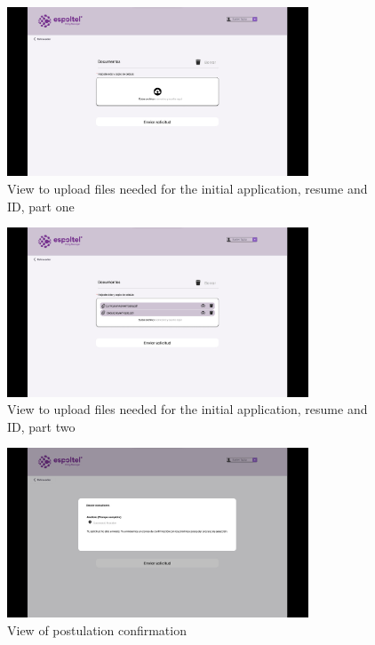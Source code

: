 \documentclass{scrreprt}
\begin{document}
\begin{figure}[H]
	\centering \small
	\includegraphics[width=0.8\textwidth]{WebPrototype/wflow-47.jpeg}
	\caption{View to upload files needed for the initial application, resume and ID, part one}
\end{figure}

\begin{figure}[H]
	\centering \small
	\includegraphics[width=0.8\textwidth]{WebPrototype/wflow-48.jpeg}
	\caption{View to upload files needed for the initial application, resume and ID, part two}
\end{figure}

\begin{figure}[H]
	\centering \small
	\includegraphics[width=0.8\textwidth]{WebPrototype/wflow-49.jpeg}
	\caption{View of postulation confirmation}
\end{figure}
\end{document}
